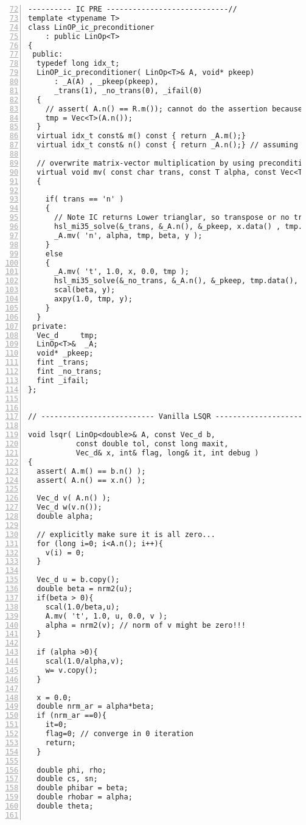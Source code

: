 \documentclass[english,11pt]{article}
\begin{document}
\begin{lstlisting}[numbers=left, firstnumber = 72]
---------- IC PRE ----------------------------//
template <typename T>
class LinOP_ic_preconditioner
    : public LinOp<T>
{
 public:
  typedef long idx_t;
  LinOP_ic_preconditioner( LinOp<T>& A, void* pkeep)
      : _A(A) , _pkeep(pkeep),
      _trans(1), _no_trans(0), _ifail(0)
  {
    // assert( A.n() == R.m()); cannot do the assertion because pkeep is difficult to handle
    tmp = Vec<T>(A.n());
  }
  virtual idx_t const& m() const { return _A.m();}
  virtual idx_t const& n() const { return _A.n();} // assuming preconditioning size match
  
  // overwrite matrix-vector multiplication by using preconditioner               
  virtual void mv( const char trans, const T alpha, const Vec<T> x, const T beta, Vec<T> y )
  {

    if( trans == 'n' )
    {
      // Note IC returns Lower trianglar, so transpose or no transpose is reversed
      hsl_mi35_solve(&_trans, &_A.n(), &_pkeep, x.data() , tmp.data() , &_ifail); 
      _A.mv( 'n', alpha, tmp, beta, y );
    }
    else
    {
      _A.mv( 't', 1.0, x, 0.0, tmp );
      hsl_mi35_solve(&_no_trans, &_A.n(), &_pkeep, tmp.data(), tmp.data(), &_ifail);
      scal(beta, y);
      axpy(1.0, tmp, y);
    }
  }                
 private:
  Vec_d     tmp;
  LinOp<T>&  _A;
  void* _pkeep;
  fint _trans;
  fint _no_trans;
  fint _ifail;
};


// -------------------------- Vanilla LSQR --------------------------//

void lsqr( LinOp<double>& A, const Vec_d b,
           const double tol, const long maxit,
           Vec_d& x, int& flag, long& it, int debug ) 
{
  assert( A.m() == b.n() );
  assert( A.n() == x.n() );

  Vec_d v( A.n() );
  Vec_d w(v.n());
  double alpha;

  // explicitly make sure it is all zero...
  for (long i=0; i<A.n(); i++){
    v(i) = 0;
  }

  Vec_d u = b.copy();
  double beta = nrm2(u);
  if(beta > 0){
    scal(1.0/beta,u);    
    A.mv( 't', 1.0, u, 0.0, v );
    alpha = nrm2(v); // norm of v might be zero!!!
  }

  if (alpha >0){
    scal(1.0/alpha,v);    
    w= v.copy();
  }

  x = 0.0;
  double nrm_ar = alpha*beta;
  if (nrm_ar ==0){
    it=0;
    flag=0; // converge in 0 iteration
    return;
  } 
  
  double phi, rho;
  double cs, sn;
  double phibar = beta;
  double rhobar = alpha;
  double theta;
  

\end{lstlisting}
\end{document}

